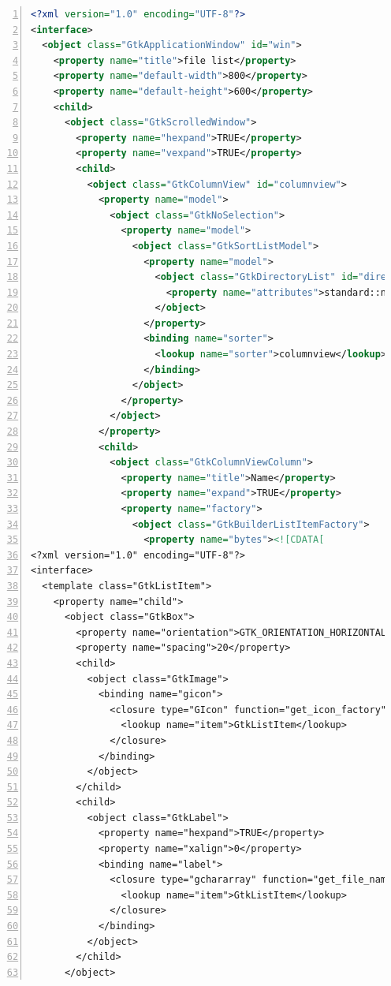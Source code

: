 \begin{lstlisting}[language=XML, numbers=left]
<?xml version="1.0" encoding="UTF-8"?>
<interface>
  <object class="GtkApplicationWindow" id="win">
    <property name="title">file list</property>
    <property name="default-width">800</property>
    <property name="default-height">600</property>
    <child>
      <object class="GtkScrolledWindow">
        <property name="hexpand">TRUE</property>
        <property name="vexpand">TRUE</property>
        <child>
          <object class="GtkColumnView" id="columnview">
            <property name="model">
              <object class="GtkNoSelection">
                <property name="model">
                  <object class="GtkSortListModel">
                    <property name="model">
                      <object class="GtkDirectoryList" id="directorylist">
                        <property name="attributes">standard::name,standard::icon,standard::size,time::modified</property>
                      </object>
                    </property>
                    <binding name="sorter">
                      <lookup name="sorter">columnview</lookup>
                    </binding>
                  </object>
                </property>
              </object>
            </property>
            <child>
              <object class="GtkColumnViewColumn">
                <property name="title">Name</property>
                <property name="expand">TRUE</property>
                <property name="factory">
                  <object class="GtkBuilderListItemFactory">
                    <property name="bytes"><![CDATA[
<?xml version="1.0" encoding="UTF-8"?>
<interface>
  <template class="GtkListItem">
    <property name="child">
      <object class="GtkBox">
        <property name="orientation">GTK_ORIENTATION_HORIZONTAL</property>
        <property name="spacing">20</property>
        <child>
          <object class="GtkImage">
            <binding name="gicon">
              <closure type="GIcon" function="get_icon_factory">
                <lookup name="item">GtkListItem</lookup>
              </closure>
            </binding>
          </object>
        </child>
        <child>
          <object class="GtkLabel">
            <property name="hexpand">TRUE</property>
            <property name="xalign">0</property>
            <binding name="label">
              <closure type="gchararray" function="get_file_name_factory">
                <lookup name="item">GtkListItem</lookup>
              </closure>
            </binding>
          </object>
        </child>
      </object>

\end{lstlisting}
